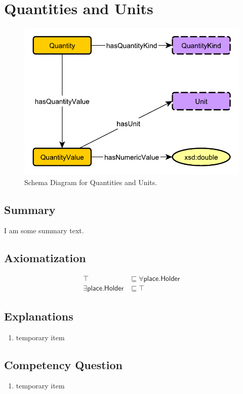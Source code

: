 \section{Quantities and Units}
\label{sec:Quantities}
\begin{figure}[h!]
\begin{center}
\includegraphics[width=.4\textwidth]{figures/quantities}
\end{center}
\caption{Schema Diagram for Quantities and Units.}
\label{fig:Quantities}
\end{figure}
\subsection{Summary}
\label{sum:Quantities}
I am some summary text.

\subsection{Axiomatization}
\label{axs:Quantities}
\begin{align}
\top &\sqsubseteq \forall\textsf{place.Holder} \\ 
\exists\textsf{place.Holder} &\sqsubseteq \top 
\end{align}

\subsection{Explanations}
\label{exp:Quantities}
\begin{enumerate}
\item temporary item
\end{enumerate}

\subsection{Competency Question}
\label{cqs:Quantities}
\begin{enumerate}[CQ1.]
\item temporary item
\end{enumerate}

\newpage
